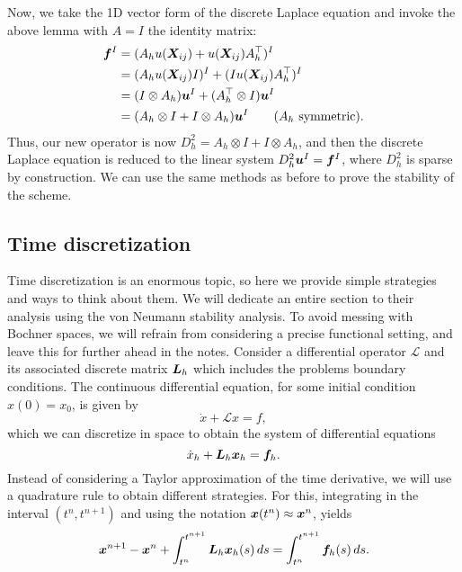 \documentclass{article}
\renewcommand{\vec}{\vectorsym}
\newcommand{\mat}{\matrixsym}
\begin{document}
Now, we take the 1D vector form of the discrete Laplace equation and invoke the above lemma with $A=I$ the identity matrix:
\begin{align*}
    \vec f^I &= (A_h u(\vec X_{ij}) + u(\vec X_{ij})A_h^\top)^I\\
    &= (A_h u(\vec X_{ij}) I)^I + (I u(\vec X_{ij})A_h^\top)^I\\
    &= (I\otimes A_h)\vec u^I + (A_h^\top \otimes I)\vec u^I\\
    &= (A_h\otimes I + I\otimes A_h)\vec u^I \tag{$A_h$ symmetric}.
\end{align*}
Thus, our new operator is now $D^2_h = A_h\otimes I + I\otimes A_h$, and then the discrete Laplace equation is reduced to the linear system $D^2_h \vec u^I = \vec f^I$, where $D^2_h$ is sparse by construction. We can use the same methods as before to prove the stability of the scheme.  

\subsection{Time discretization}
Time discretization is an enormous topic, so here we provide simple strategies and ways to think about them. We will dedicate an entire section to their analysis using the von Neumann stability analysis. To avoid messing with Bochner spaces, we will refrain from considering a precise functional setting, and leave this for further ahead in the notes. Consider a differential operator $\mathcal L$ and its associated discrete matrix $\mat L_h$ which includes the problems boundary conditions. The continuous differential equation, for some initial condition $x(0) = x_0$, is given by 
    $$ \dot x + \mathcal L x = f, $$
    which we can discretize in space to obtain the system of differential equations
    $$ \dot x_h + \mat L_h \vec x_h = \vec f_h. $$
    Instead of considering a Taylor approximation of the time derivative, we will use a quadrature rule to obtain different strategies. For this, integrating in the interval $(t^n, t^{n+1})$ and using the notation $\vec x(t^n) \approx \vec x^{n}$, yields
    $$ \vec x^{n+1} - \vec x^n + \int_{t^n}^{t^{n+1}} \mat L_h \vec x_h(s) \,ds = \int_{t^n}^{t^{n+1}} \vec f_h(s)\,ds. $$
\end{document}
